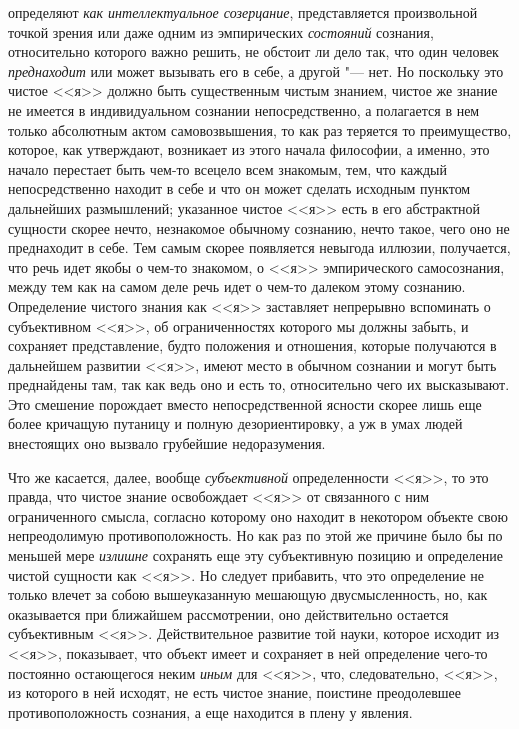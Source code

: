 определяют {\em как интеллектуальное созерцание},
представляется произвольной точкой зрения или даже одним из эмпирических
{\em состояний} сознания, относительно которого важно
решить, не обстоит ли дело так, что один человек
{\em преднаходит} или может вызывать его в себе, а
другой "--- нет. Но поскольку это чистое <<я>> должно быть существенным чистым
знанием, чистое же знание не имеется в индивидуальном сознании
непосредственно, а полагается в нем только абсолютным актом самовозвышения,
то как раз теряется то преимущество, которое, как утверждают, возникает из
этого начала философии, а именно, это начало перестает быть чем-то всецело
всем знакомым, тем, что каждый непосредственно находит в себе и что он
может сделать исходным пунктом дальнейших размышлений; указанное чистое <<я>>
есть в его абстрактной сущности скорее нечто, незнакомое обычному сознанию,
нечто такое, чего оно не преднаходит в себе. Тем самым скорее появляется
невыгода иллюзии, получается, что речь идет якобы о чем-то знакомом, о <<я>>
эмпирического самосознания, между тем как на самом деле речь идет о чем-то
далеком этому сознанию. Определение чистого знания как <<я>> заставляет
непрерывно вспоминать о субъективном <<я>>, об ограниченностях которого мы
должны забыть, и сохраняет представление, будто положения и отношения,
которые получаются в дальнейшем развитии <<я>>, имеют место в обычном
сознании и могут быть преднайдены там, так как ведь оно и есть то,
относительно чего их высказывают. Это смешение порождает вместо
непосредственной ясности скорее лишь еще более кричащую путаницу и полную
дезориентировку, а уж в умах людей внестоящих оно вызвало грубейшие
недоразумения.

Что же касается, далее, вообще {\em субъективной}
определенности <<я>>, то это правда, что чистое знание освобождает <<я>> от
связанного с ним ограниченного смысла, согласно которому оно находит в
некотором объекте свою непреодолимую противоположность. Но как раз по этой
же причине было бы по меньшей мере {\em излишне}
сохранять еще эту субъективную позицию и определение чистой сущности как
<<я>>. Но следует прибавить, что это определение не только влечет за собою
вышеуказанную мешающую двусмысленность, но, как оказывается при ближайшем
рассмотрении, оно действительно остается субъективным <<я>>. Действительное
развитие той науки, которое исходит из <<я>>, показывает, что объект имеет и
сохраняет в ней определение чего-то постоянно остающегося неким
{\em иным} для <<я>>, что, следовательно, <<я>>, из
которого в ней исходят, не есть чистое знание, поистине преодолевшее
противоположность сознания, а еще находится в плену у явления.


